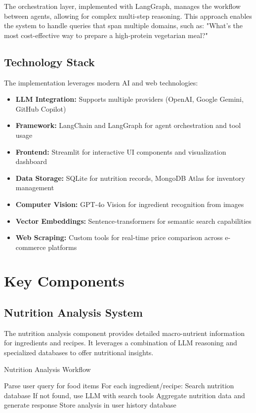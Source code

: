 \documentclass[10pt,twocolumn,letterpaper]{article}
\begin{document}
The orchestration layer, implemented with LangGraph, manages the workflow between agents, allowing for complex multi-step reasoning. This approach enables the system to handle queries that span multiple domains, such as: "What's the most cost-effective way to prepare a high-protein vegetarian meal?"

\subsection{Technology Stack}

The implementation leverages modern AI and web technologies:

\begin{itemize}[noitemsep,topsep=0pt]
    \item \textbf{LLM Integration:} Supports multiple providers (OpenAI, Google Gemini, GitHub Copilot)
    \item \textbf{Framework:} LangChain and LangGraph for agent orchestration and tool usage
    \item \textbf{Frontend:} Streamlit for interactive UI components and visualization dashboard
    \item \textbf{Data Storage:} SQLite for nutrition records, MongoDB Atlas for inventory management
    \item \textbf{Computer Vision:} GPT-4o Vision for ingredient recognition from images
    \item \textbf{Vector Embeddings:} Sentence-transformers for semantic search capabilities
    \item \textbf{Web Scraping:} Custom tools for real-time price comparison across e-commerce platforms
\end{itemize}

\section{Key Components}

\subsection{Nutrition Analysis System}

The nutrition analysis component provides detailed macro-nutrient information for ingredients and recipes. It leverages a combination of LLM reasoning and specialized databases to offer nutritional insights.

\begin{algorithm}
\caption{Nutrition Analysis Workflow}
\begin{algorithmic}[1]
\State Parse user query for food items
\State For each ingredient/recipe:
\State \hspace{\algorithmicindent} Search nutrition database
\State \hspace{\algorithmicindent} If not found, use LLM with search tools
\State Aggregate nutrition data and generate response
\State Store analysis in user history database
\end{algorithmic}
\end{algorithm}
\end{document}
